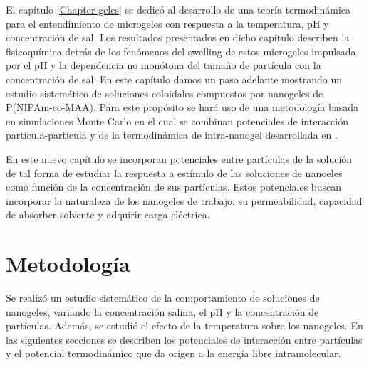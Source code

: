 	El cap\'itulo \ref{Chapter-geles} se dedic\'o al desarrollo de una teor\'ia termodin\'amica para el entendimiento de microgeles con respuesta a la temperatura, pH y concentraci\'on de sal. Los resultados presentados en dicho cap\'itulo describen la fisicoqu\'imica detr\'as de los fen\'omenos del swelling de estos microgeles impulsada por el pH y la dependencia no mon\'otona del tama\~no de part\'icula con la concentraci\'on de sal. 
	En este cap\'itulo damos un paso  adelante mostrando un estudio sistem\'atico de soluciones coloidales compuestos por nanogeles de P(NIPAm-co-MAA). Para este prop\'osito se har\'a uso de una metodolog\'ia basada en simulaciones Monte Carlo en el cual se combinan potenciales de interacci\'on part\'icula-part\'icula y de la termodin\'amica de intra-nanogel desarrollada en \cite{perez2021thermodynamic}. 
	
	
	En este nuevo cap\'itulo se incorporan potenciales entre part\'iculas de la soluci\'on de tal forma de estudiar la respuesta a est\'imulo de las soluciones de nanoeles como funci\'on de la concentraci\'on de sus part\'iculas. Estos potenciales buscan incorporar la naturaleza de los nanogeles de trabajo: su permeabilidad, capacidad de absorber solvente y adquirir carga el\'ectrica.

	
	
	
	
	
	\section{Metodolog\'ia}
	
	Se realiz\'o un estudio sistem\'atico de la comportamiento de soluciones de nanogeles, variando la concentraci\'on salina, el pH y la concentraci\'on de part\'iculas. Adem\'as, se estudi\'o  el efecto de la temperatura sobre los nanogeles. En las siguientes secciones se describen los potenciales de interacci\'on entre part\'iculas y el potencial termodin\'amico que da origen a la energ\'ia libre intramolecular. 
	

